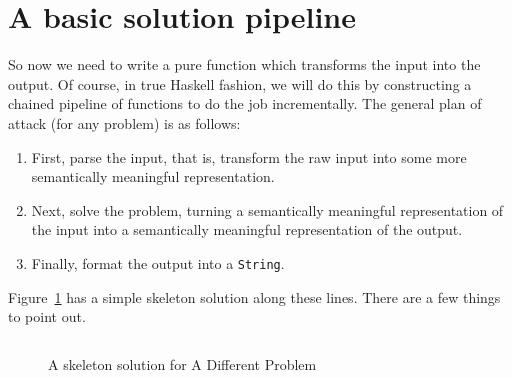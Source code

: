 \documentclass{book}
\newcommand{\h}[1]{\texttt{#1}}
\begin{document}
\section{A basic solution pipeline}
\label{sec:pipeline}

So now we need to write a pure function which transforms the input
into the output.  Of course, in true Haskell fashion, we will do this
by constructing a chained pipeline of functions to do the job
incrementally.  The general plan of attack (for any problem) is
as follows:
\begin{enumerate}
\item First, parse the input, that is, transform the raw input
  into some more semantically meaningful representation.
\item Next, solve the problem, turning a semantically meaningful
  representation of the input into a semantically meaningful
  representation of the output.
\item Finally, format the output into a \h{String}.
\end{enumerate}
Figure~\ref{fig:skeleton-different} has a simple skeleton solution along
these lines. There are a few things to point out.

\begin{figure}
  \centering
  \inputminted{haskell}{code/intro/Skeleton.hs}
  \caption{A skeleton solution for A Different Problem}
  \label{fig:skeleton-different}
\end{figure}
\end{document}
